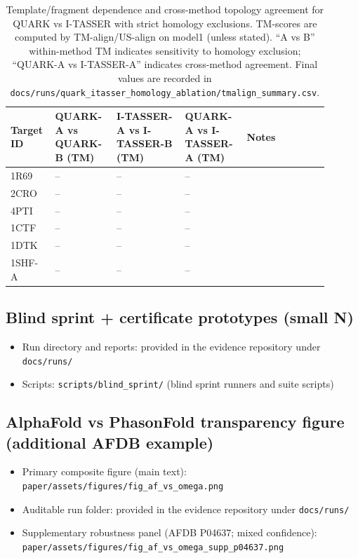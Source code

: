 \begin{table}[t]
  \centering
  \caption{Template/fragment dependence and cross-method topology agreement for QUARK vs I-TASSER with strict homology exclusions. TM-scores are computed by TM-align/US-align on model1 (unless stated). ``A vs B'' within-method TM indicates sensitivity to homology exclusion; ``QUARK-A vs I-TASSER-A'' indicates cross-method agreement. Final values are recorded in \texttt{docs/runs/quark\_itasser\_homology\_ablation/tmalign\_summary.csv}.}
  \label{tab:quark_itasser_homology_ablation}
  {%
  \scriptsize
  \setlength{\tabcolsep}{4pt}
  \renewcommand{\arraystretch}{1.10}
  \begin{tabular}{p{0.10\linewidth}p{0.18\linewidth}p{0.20\linewidth}p{0.18\linewidth}p{0.24\linewidth}}
    \toprule
    Target ID & QUARK-A vs QUARK-B (TM) & I-TASSER-A vs I-TASSER-B (TM) & QUARK-A vs I-TASSER-A (TM) & Notes \\
    \midrule
    1R69 & -- & -- & -- &  \\
    2CRO & -- & -- & -- &  \\
    4PTI & -- & -- & -- &  \\
    1CTF & -- & -- & -- &  \\
    1DTK & -- & -- & -- &  \\
    1SHF-A & -- & -- & -- &  \\
    \bottomrule
  \end{tabular}
  }%
\end{table}

\subsection*{Blind sprint + certificate prototypes (small N)}
\begin{itemize}
  \item Run directory and reports: provided in the evidence repository under \texttt{docs/runs/}
  \item Scripts: \texttt{scripts/blind\_sprint/} (blind sprint runners and suite scripts)
\end{itemize}

\subsection*{AlphaFold vs PhasonFold transparency figure (additional AFDB example)}
\begin{itemize}
  \item Primary composite figure (main text): \texttt{paper/assets/figures/fig\_af\_vs\_omega.png}
  \item Auditable run folder: provided in the evidence repository under \texttt{docs/runs/}
  \item Supplementary robustness panel (AFDB P04637; mixed confidence): \texttt{paper/assets/figures/fig\_af\_vs\_omega\_supp\_p04637.png}
\end{itemize}

